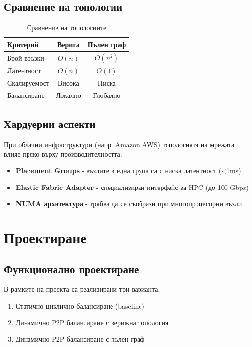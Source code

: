 \documentclass[12pt,a4paper]{article}
\begin{document}
\subsection{Сравнение на топологии}

\begin{table}[H]
\centering
\begin{tabular}{lcc}
\toprule
\textbf{Критерий} & \textbf{Верига} & \textbf{Пълен граф} \\
\midrule
Брой връзки & $O(n)$ & $O(n^2)$ \\
Латентност & $O(n)$ & $O(1)$ \\
Скалируемост & Висока & Ниска \\
Балансиране & Локално & Глобално \\
\bottomrule
\end{tabular}
\caption{Сравнение на топологиите}
\end{table}

\subsection{Хардуерни аспекти}

При облачни инфраструктури (напр. Amazon AWS) топологията на мрежата влияе пряко върху производителността:

\begin{itemize}
    \item \textbf{Placement Groups} - възлите в една група са с ниска латентност (<1ms)
    \item \textbf{Elastic Fabric Adapter} - специализиран интерфейс за HPC (до 100 Gbps)
    \item \textbf{NUMA архитектура} - трябва да се съобрази при многопроцесорни възли
\end{itemize}

\section{Проектиране}

\subsection{Функционално проектиране}

В рамките на проекта са реализирани три варианта:
\begin{enumerate}
    \item Статично циклично балансиране (baseline)
    \item Динамично P2P балансиране с верижна топология
    \item Динамично P2P балансиране с пълен граф
\end{enumerate}
\end{document}
